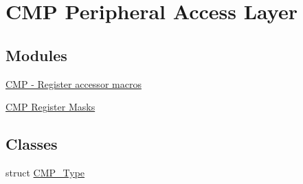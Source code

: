 \hypertarget{group__CMP__Peripheral__Access__Layer}{}\section{C\+MP Peripheral Access Layer}
\label{group__CMP__Peripheral__Access__Layer}
\subsection*{Modules}
\begin{DoxyCompactItemize}
\item 
\hyperlink{group__CMP__Register__Accessor__Macros}{C\+M\+P -\/ Register accessor macros}
\item 
\hyperlink{group__CMP__Register__Masks}{C\+M\+P Register Masks}
\end{DoxyCompactItemize}
\subsection*{Classes}
\begin{DoxyCompactItemize}
\item 
struct \hyperlink{structCMP__Type}{C\+M\+P\+\_\+\+Type}
\end{DoxyCompactItemize}
